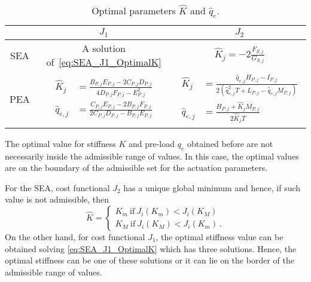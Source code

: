 \begin{table}[ht!]
\begin{center}
	\tiny
	\tabcolsep 3pt
	\renewcommand\arraystretch{1.5}
\begin{tabular}{c|cc}
    &  $J_1$ & $J_2$  \\ 
\hline
\hline
SEA & A solution of~\eqref{eq:SEA_J1_OptimalK}  &  $\hat{K}_j = -2\frac{F_{S,j}}{G_{S,j}}$ \\
\hline
PEA & $\begin{aligned}\hat{K}_j &= \frac{B_{P,j}E_{P,j}-2C_{P,j}D_{P,j}}{4D_{P,j}F_{P,j}-E^2_{P,j}}\\
\hat{q}_{e,j} &= \frac{C_{P,j}E_{P,j} - 2B_{P,j}F_{P,j}}{2C_{P,j}D_{P,j}-B_{P,j}E_{P,j}}\end{aligned}$ 
    & $\begin{aligned}\hat{K}_j &= \frac{\hat{q}_{e,j}H_{P,j}-I_{P,j}}{2(\hat{q}^2_{e,j}T+L_{P,j}-\hat{q}_{e,j}M_{P,j})}\\
	\hat{q}_{e,j} &= \frac{H_{P,j} + \hat{K}_jM_{P,j}}{2\hat{K}_jT}\end{aligned}$  \\ 																	
\end{tabular}
\end{center}
\caption{Optimal parameters $\hat K$ and $\hat q_e$.}
\label{tab:optimumval2}
\vspace{-0.5cm}
\end{table}
The optimal value for stiffness $K$ and pre-load $q_e$ obtained before are not necessarily inside the admissible range of values. In this case, the optimal values are on the boundary of the admissible set for the actuation parameters. 

For the SEA, cost functional $J_2$ has a unique global minimum and hence, if such value is not admissible, then
\begin{equation}
\hat{K} = \begin{cases} K_m \ \text{if} \ J_i(K_m)< J_i(K_M) \\
K_M \ \text{if} \ J_i(K_M)< J_i(K_m)\,.
\end{cases}
\label{eq:KboundsSEA}
\end{equation}
On the other hand, for cost functional $J_1$, the optimal stiffness value can be obtained solving \eqref{eq:SEA_J1_OptimalK} which has three solutions. Hence, the optimal stiffness can be one of these solutions or it can lie on the border of the admissible range of values.  


